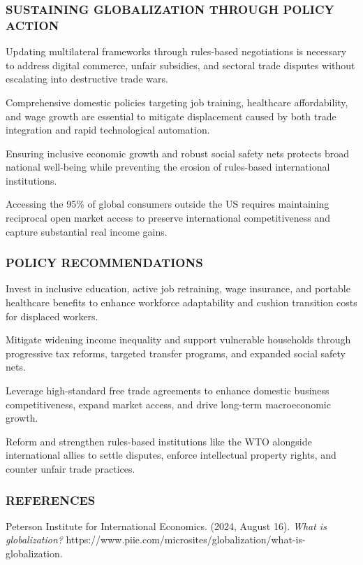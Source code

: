 \documentclass[10pt, aspectratio=169]{beamer}
\begin{document}
\begin{frame}[t]
    \frametitle{SUSTAINING GLOBALIZATION THROUGH POLICY ACTION}
    \vfill
    \begin{itemize}
        \setlength{\itemsep}{0.35cm}
        {\small
        \item Updating multilateral frameworks through rules-based negotiations is necessary to address digital commerce, unfair subsidies, and sectoral trade disputes without escalating into destructive trade wars.
        \item Comprehensive domestic policies targeting job training, healthcare affordability, and wage growth are essential to mitigate displacement caused by both trade integration and rapid technological automation.
        \item Ensuring inclusive economic growth and robust social safety nets protects broad national well-being while preventing the erosion of rules-based international institutions.
        \item Accessing the 95\% of global consumers outside the US requires maintaining reciprocal open market access to preserve international competitiveness and capture substantial real income gains.
        }
    \end{itemize}
    \vfill
\end{frame}
\begin{frame}[t]
    \frametitle{POLICY RECOMMENDATIONS}
    \vfill
    \begin{itemize}
        \setlength{\itemsep}{0.35cm}
        {\small
        \item Invest in inclusive education, active job retraining, wage insurance, and portable healthcare benefits to enhance workforce adaptability and cushion transition costs for displaced workers.
        \item Mitigate widening income inequality and support vulnerable households through progressive tax reforms, targeted transfer programs, and expanded social safety nets.
        \item Leverage high-standard free trade agreements to enhance domestic business competitiveness, expand market access, and drive long-term macroeconomic growth.
        \item Reform and strengthen rules-based institutions like the WTO alongside international allies to settle disputes, enforce intellectual property rights, and counter unfair trade practices.
        }
    \end{itemize}
    \vfill
\end{frame}
\begin{frame}[t]
    \frametitle{REFERENCES}
    \vfill
    \begin{itemize}
        \setlength{\itemsep}{0.35cm}
        {\small
        \item Peterson Institute for International Economics. (2024, August 16). \textit{What is globalization?} https://www.piie.com/microsites/globalization/what-is-globalization.
        }
    \end{itemize}
    \vfill
\end{frame}
	
\end{document}
